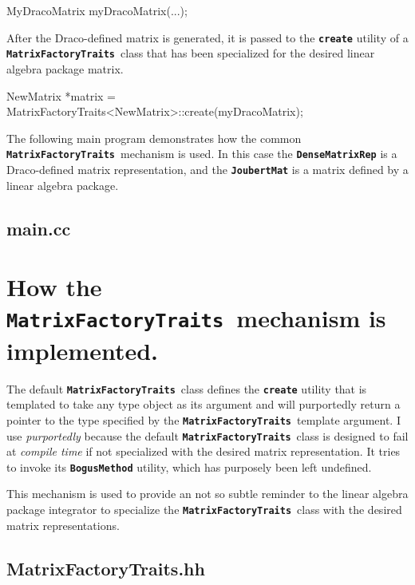 \documentclass[11pt]{nmemo}
\newcommand{\cxxcode}{\color{codecolor}}
\newcommand{\code}[1]{\textbf{\texttt{\textcolor{codecolor}{#1}}}}
\newcommand{\MFT}{\code{Matrix\-Factory\-Traits}\ }
\begin{document}
\begin{ttfamily}
\cxxcode
  MyDracoMatrix myDracoMatrix(...);
\end{ttfamily}

After the Draco-defined matrix is generated, it is passed to the
\code{create} utility of a \MFT class
that has been specialized for the desired linear algebra package matrix.

\begin{ttfamily}
\cxxcode
  NewMatrix *matrix = 
    MatrixFactoryTraits<NewMatrix>::create(myDracoMatrix);
\end{ttfamily}

The following main program demonstrates how the common
\MFT mechanism is used.
In this case the \code{DenseMatrixRep} is a Draco-defined matrix
representation, and the \code{JoubertMat} is a matrix defined by a
linear algebra package.

\subsection{main.cc}

\begin{ttfamily}
\begin{small}
\cxxcode

\end{small}
\end{ttfamily}

\section{How the \MFT mechanism is implemented.}

The default \MFT class defines the \code{create} utility that is
templated to take any type object as its
argument and will purportedly return a pointer to the type specified
by the \MFT template argument.
I use \emph{purportedly} because the default \MFT class is designed
to fail at \emph{compile time}
if not specialized with the desired matrix representation.
It tries to invoke its \code{BogusMethod} utility, which has purposely
been left undefined.

This mechanism is used to provide an not so subtle reminder to the
linear algebra package integrator to specialize the \MFT class with
the desired matrix representations.

\subsection{MatrixFactoryTraits.hh}
\end{document}
